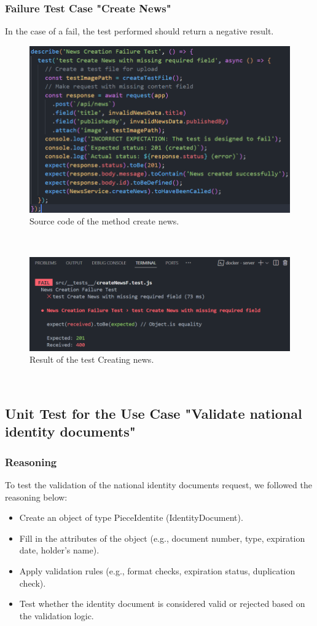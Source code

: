 \subsubsection{Failure Test Case "Create News"}
In the case of a fail, the test performed should return a negative result.
\begin{figure}[h!]
    \centering
    \includegraphics[width=1\textwidth]{figures/create newsF code.png}
    \caption{Source code of the method create news.}
\end{figure} \
\begin{figure}[h!]
    \centering
    \includegraphics[width=1\textwidth]{figures/result create newsF.png}  
    \caption{Result of the test Creating news.}
\end{figure} \
\clearpage

\subsection{ Unit Test for the Use Case "Validate national identity documents"}
\subsubsection{Reasoning}
To test the validation of the national identity documents request, we followed the reasoning below:
\begin{itemize}
    \item Create an object of type PieceIdentite (IdentityDocument).
    \item Fill in the attributes of the object (e.g., document number, type, expiration date, holder's name).
    \item Apply validation rules (e.g., format checks, expiration status, duplication check).
    \item Test whether the identity document is considered valid or rejected based on the validation logic.
\end{itemize}
